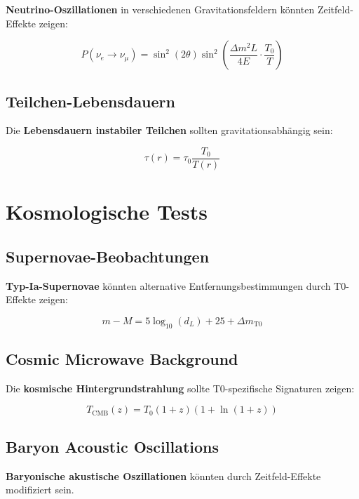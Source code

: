 \documentclass[12pt,a4paper]{report}
\begin{document}
	\textbf{Neutrino-Oszillationen} in verschiedenen Gravitationsfeldern könnten Zeitfeld-Effekte zeigen:
	
	\begin{equation}
		P(\nu_e \to \nu_\mu) = \sin^2(2\theta) \sin^2\left(\frac{\Delta m^2 L}{4E} \cdot \frac{T_0}{T}\right)
	\end{equation}
	
	\subsection{Teilchen-Lebensdauern}
	
	Die \textbf{Lebensdauern instabiler Teilchen} sollten gravitationsabhängig sein:
	
	\begin{equation}
		\tau(r) = \tau_0 \frac{T_0}{T(r)}
	\end{equation}
	
	\section{Kosmologische Tests}
	
	\subsection{Supernovae-Beobachtungen}
	
	\textbf{Typ-Ia-Supernovae} könnten alternative Entfernungsbestimmungen durch T0-Effekte zeigen:
	
	\begin{equation}
		m - M = 5\log_{10}(d_L) + 25 + \Delta m_{\text{T0}}
	\end{equation}
	
	\subsection{Cosmic Microwave Background}
	
	Die \textbf{kosmische Hintergrundstrahlung} sollte T0-spezifische Signaturen zeigen:
	
	\begin{equation}
		T_{\text{CMB}}(z) = T_0(1+z)(1+\ln(1+z))
	\end{equation}
	
	\subsection{Baryon Acoustic Oscillations}
	
	\textbf{Baryonische akustische Oszillationen} könnten durch Zeitfeld-Effekte modifiziert sein.
	
\end{document}
